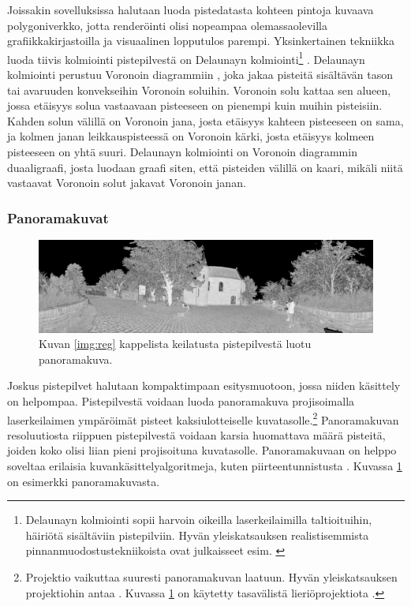 Joissakin sovelluksissa halutaan luoda pistedatasta kohteen pintoja kuvaava polygoniverkko, jotta renderöinti olisi nopeampaa olemassaolevilla grafiikkakirjastoilla ja visuaalinen lopputulos parempi. Yksinkertainen tekniikka luoda tiivis kolmiointi pistepilvestä on Delaunayn kolmiointi\footnote{Delaunayn kolmiointi sopii harvoin oikeilla laserkeilaimilla taltioituihin, häiriötä sisältäviin pistepilviin. Hyvän yleiskatsauksen realistisemmista pinnanmuodostustekniikoista ovat julkaisseet esim. \cite{berger}} . Delaunayn kolmiointi perustuu Voronoin diagrammiin , joka jakaa pisteitä sisältävän tason tai avaruuden konvekseihin Voronoin soluihin. Voronoin solu kattaa sen alueen, jossa etäisyys solua vastaavaan pisteeseen on pienempi kuin muihin pisteisiin. Kahden solun välillä on Voronoin jana, josta etäisyys kahteen pisteeseen on sama, ja kolmen janan leikkauspisteessä on Voronoin kärki, josta etäisyys kolmeen pisteeseen on yhtä suuri. Delaunayn kolmiointi on Voronoin diagrammin duaaligraafi, josta luodaan graafi siten, että pisteiden välillä on kaari, mikäli niitä vastaavat Voronoin solut jakavat Voronoin janan. \cite{delaunay}

\subsubsection{Panoramakuvat}

\begin{figure}
    \centering
    \includegraphics[width=\textwidth]{img/pano.png}
    \caption{Kuvan \ref{img:reg} kappelista keilatusta pistepilvestä luotu panoramakuva.}
    \label{img:pano}
\end{figure}


Joskus pistepilvet halutaan kompaktimpaan esitysmuotoon, jossa niiden käsittely on helpompaa. Pistepilvestä voidaan luoda panoramakuva projisoimalla laserkeilaimen ympäröimät pisteet kaksiulotteiselle kuvatasolle.\footnote{Projektio vaikuttaa suuresti panoramakuvan laatuun. Hyvän yleiskatsauksen projektiohin antaa \cite{proj}. Kuvassa \ref{img:pano} on käytetty tasavälistä lieriöprojektiota .} Panoramakuvan resoluutiosta riippuen pistepilvestä voidaan karsia huomattava määrä pisteitä, joiden koko olisi liian pieni projisoituna kuvatasolle. Panoramakuvaan on helppo soveltaa erilaisia kuvankäsittelyalgoritmeja, kuten piirteentunnistusta . Kuvassa \ref{img:pano} on esimerkki panoramakuvasta.

